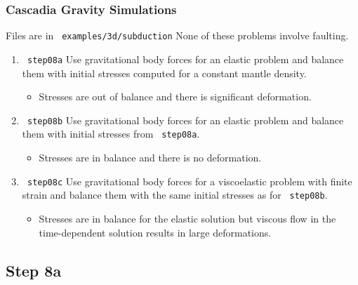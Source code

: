 \documentclass{beamer}
\begin{document}
\begin{frame}
  \frametitle{Cascadia Gravity Simulations}
  \summary{}

  \vfill
  Files are in {\tt\color{red} examples/3d/subduction}
  None of these problems involve faulting.
  \vfill

\begin{enumerate}
\item {\tt\color{red} step08a} Use gravitational body forces for an
  elastic problem and balance them with initial stresses computed for a
  constant mantle density.
  \begin{itemize}
  \item Stresses are out of balance and there is significant
    deformation.
  \end{itemize}
\item {\tt\color{red} step08b} Use gravitational body forces for an
  elastic problem and balance them with initial stresses from
  {\tt\color{red} step08a}.
  \begin{itemize}
  \item Stresses are in balance and there is no deformation.
  \end{itemize}
\item {\tt\color{red} step08c} Use gravitational body forces for a
  viscoelastic problem with finite strain and balance them with the same
  initial stresses as for {\tt\color{red} step08b}.
  \begin{itemize}
  \item Stresses are in balance for the elastic solution but viscous
    flow in the time-dependent solution results in large deformations.
  \end{itemize}
\end{enumerate}

\end{frame}


\subsection{Step 8a}
\end{document}
